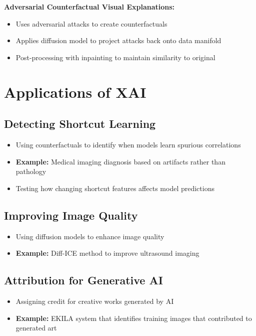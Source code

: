 \textbf{Adversarial Counterfactual Visual Explanations:}
\begin{itemize}
    \item Uses adversarial attacks to create counterfactuals
    \item Applies diffusion model to project attacks back onto data manifold
    \item Post-processing with inpainting to maintain similarity to original
\end{itemize}
\section*{Applications of XAI}

\subsection*{Detecting Shortcut Learning}
\begin{itemize}
    \item Using counterfactuals to identify when models learn spurious correlations
    \item \textbf{Example:} Medical imaging diagnosis based on artifacts rather than pathology
    \item Testing how changing shortcut features affects model predictions
\end{itemize}

\subsection*{Improving Image Quality}
\begin{itemize}
    \item Using diffusion models to enhance image quality
    \item \textbf{Example:} Diff-ICE method to improve ultrasound imaging
\end{itemize}

\subsection*{Attribution for Generative AI}
\begin{itemize}
    \item Assigning credit for creative works generated by AI
    \item \textbf{Example:} EKILA system that identifies training images that contributed to generated art
\end{itemize}

